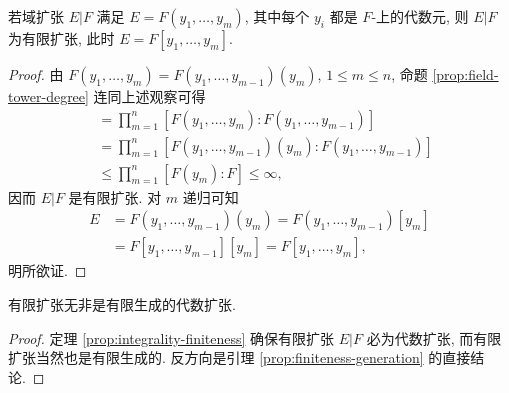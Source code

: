 \begin{lemma}\label{prop:finiteness-generation}
	若域扩张 $E|F$ 满足 $E=F(y_1, \ldots, y_m)$, 其中每个 $y_i$ 都是 $F$-上的代数元, 则 $E|F$ 为有限扩张, 此时 $E=F[y_1, \ldots, y_m]$.
\end{lemma}
\begin{proof}
	由 $F(y_1, \ldots, y_m) = F(y_1, \ldots, y_{m-1})(y_m)$, $1 \leq m \leq n$, 命题 \ref{prop:field-tower-degree} 连同上述观察可得
	\begin{align*}
		[F(y_1, \ldots, y_n):F] & = \prod_{m=1}^n \left[ F(y_1, \ldots, y_m): F(y_1, \ldots, y_{m-1}) \right] \\
		& = \prod_{m=1}^n \left[ F(y_1, \ldots, y_{m-1})(y_m): F(y_1, \ldots, y_{m-1}) \right] \\
		& \leq \prod_{m=1}^n [F(y_m):F] \leq \infty,
	\end{align*}
	因而 $E|F$ 是有限扩张. 对 $m$ 递归可知
	\begin{equation*}\begin{aligned}
		E & = F(y_1, \ldots, y_{m-1})(y_m) = F(y_1, \ldots, y_{m-1})[y_m] \\
		& = F[y_1, \ldots, y_{m-1}][y_m] = F[y_1, \ldots, y_m],
	\end{aligned}\end{equation*}
	明所欲证.
\end{proof}

\begin{lemma}\label{prop:finite-vs-algebraic}
	有限扩张无非是有限生成的代数扩张.
\end{lemma}
\begin{proof}
	定理 \ref{prop:integrality-finiteness} 确保有限扩张 $E|F$ 必为代数扩张, 而有限扩张当然也是有限生成的. 反方向是引理 \ref{prop:finiteness-generation} 的直接结论.
\end{proof}

